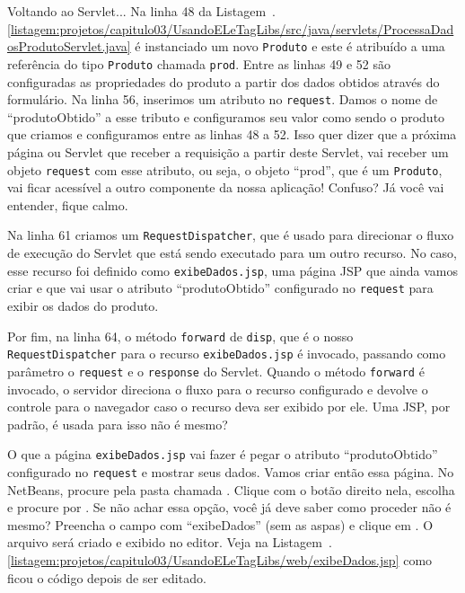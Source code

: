 Voltando ao Servlet... Na linha 48 da Listagem~\thechapter.\ref{listagem:projetos/capitulo03/UsandoELeTagLibs/src/java/servlets/ProcessaDadosProdutoServlet.java} é instanciado um novo \texttt{Produto} e este é atribuído a uma referência do tipo \texttt{Produto} chamada \texttt{prod}. Entre as linhas 49 e 52 são configuradas as propriedades do produto a partir dos dados obtidos através do formulário. Na linha 56, inserimos um atributo no \texttt{request}. Damos o nome de ``produtoObtido'' a esse tributo e configuramos seu valor como sendo o produto que criamos e configuramos entre as linhas 48 a 52. Isso quer dizer que a próxima página ou Servlet que receber a requisição a partir deste Servlet, vai receber um objeto \texttt{request} com esse atributo, ou seja, o objeto ``prod'', que é um \texttt{Produto}, vai ficar acessível a outro componente da nossa aplicação! Confuso? Já você vai entender, fique calmo.

Na linha 61 criamos um \texttt{RequestDispatcher}, que é usado para direcionar o fluxo de execução do Servlet que está sendo executado para um outro recurso. No caso, esse recurso foi definido como \texttt{exibeDados.jsp}, uma página JSP que ainda vamos criar e que vai usar o atributo ``produtoObtido'' configurado no \texttt{request} para exibir os dados do produto.

Por fim, na linha 64, o método \texttt{forward} de \texttt{disp}, que é o nosso \texttt{RequestDispatcher} para o recurso \texttt{exibeDados.jsp} é invocado, passando como parâmetro o \texttt{request} e o \texttt{response} do Servlet. Quando o método \texttt{forward} é invocado, o servidor direciona o fluxo para o recurso configurado e devolve o controle para o navegador caso o recurso deva ser exibido por ele. Uma JSP, por padrão, é usada para isso não é mesmo?

O que a página \texttt{exibeDados.jsp} vai fazer é pegar o atributo ``produtoObtido'' configurado no \texttt{request} e mostrar seus dados. Vamos criar então essa página. No NetBeans, procure pela pasta chamada . Clique com o botão direito nela, escolha  e procure por . Se não achar essa opção, você já deve saber como proceder não é mesmo? Preencha o campo  com ``exibeDados'' (sem as aspas) e clique em . O arquivo será criado e exibido no editor. Veja na Listagem~\thechapter.\ref{listagem:projetos/capitulo03/UsandoELeTagLibs/web/exibeDados.jsp} como ficou o código depois de ser editado.


